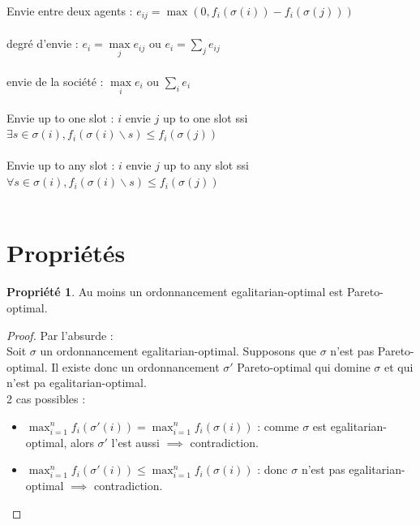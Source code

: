 \documentclass[12pt]{article}
\theoremstyle{definition}
\newtheorem{prop}{Propriété}
\begin{document}
Envie entre deux agents : $e_{ij} = \max(0, f_i(\sigma(i)) - f_i(\sigma(j)))$\\\\
degré d'envie : $e_i = \max\limits_j e_{ij}$ ou $e_i = \sum\limits_j e_{ij}$\\\\
envie de la société : $\max\limits_i e_i$ ou $\sum\limits_i e_i$\\\\
Envie up to one slot : $i$ envie $j$ up to one slot ssi $\exists s\in \sigma(i), f_i(\sigma(i)\backslash s)\leq f_i(\sigma(j))$\\\\
Envie up to any slot : $i$ envie $j$ up to any slot ssi $\forall s\in \sigma(i), f_i(\sigma(i)\backslash s)\leq f_i(\sigma(j))$\\\\


\section{Propriétés}
\begin{prop}
    Au moins un ordonnancement egalitarian-optimal est Pareto-optimal.
\end{prop}

\begin{proof}
    Par l'absurde :\\
    Soit $\sigma$ un ordonnancement egalitarian-optimal. Supposons que $\sigma$ n'est pas Pareto-optimal. Il existe donc un ordonnancement $\sigma'$ Pareto-optimal qui domine $\sigma$ et qui n'est pa egalitarian-optimal.\\
    2 cas possibles : 
    \begin{itemize}
        \item $\max_{i = 1}^n f_i(\sigma'(i)) = \max_{i = 1}^n f_i(\sigma(i))$ : comme $\sigma$ est egalitarian-optimal, alors $\sigma'$ l'est aussi $\implies$ contradiction.
        \item $\max_{i = 1}^n f_i(\sigma'(i)) \leq \max_{i = 1}^n f_i(\sigma(i))$ : donc $\sigma$ n'est pas egalitarian-optimal $\implies$ contradiction.
    \end{itemize}
\end{proof}
\end{document}
